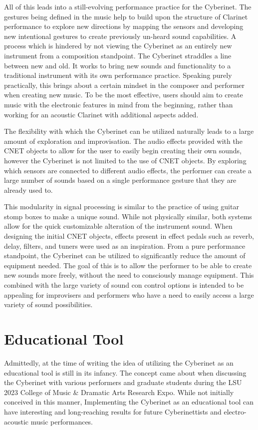 All of this leads into a still-evolving performance practice for the Cyberinet. The gestures being defined in the music help to build upon the structure of Clarinet performance to explore new directions by mapping the sensors and developing new intentional gestures to create previously un-heard sound capabilities. A process which is hindered by not viewing the Cyberinet as an entirely new instrument from a composition standpoint. The Cyberinet straddles a line between new and old. It works to bring new sounds and functionality to a traditional instrument with its own performance practice. Speaking purely practically, this brings about a certain mindset in the composer and performer when creating new music. To be the most effective, users should aim to create music with the electronic features in mind from the beginning, rather than working for an acoustic Clarinet with additional aspects added. 

The flexibility with which the Cyberinet can be utilized naturally leads to a large amount of exploration and improvisation. The audio effects provided with the CNET objects to allow for the user to easily begin creating their own sounds, however the Cyberinet is not limited to the use of CNET objects. By exploring which sensors are connected to different audio effects, the performer can create a large number of sounds based on a single performance gesture that they are already used to.

This modularity in signal processing is similar to the practice of using guitar stomp boxes to make a unique sound. While not physically similar, both systems allow for the quick customizable alteration of the instrument sound. When designing the initial CNET objects, effects present in effect pedals such as reverb, delay, filters, and tuners were used as an inspiration. From a pure performance standpoint, the Cyberinet can be utilized to significantly reduce the amount of equipment needed. The goal of this is to allow the performer to be able to create new sounds more freely, without the need to consciously manage equipment. This combined with the large variety of sound con control options is intended to be appealing for improvisers and performers who have a need to easily access a large variety of sound possibilities.

\section{Educational Tool}
Admittedly, at the time of writing the idea of utilizing the Cyberinet as an educational tool is still in its infancy. The concept came about when discussing the Cyberinet with various performers and graduate students during the LSU 2023 College of Music \& Dramatic Arts Research Expo. While not initially conceived in this manner, Implementing the Cyberinet as an educational tool can have interesting and long-reaching results for future Cyberinettists and electro-acoustic music performances. 

